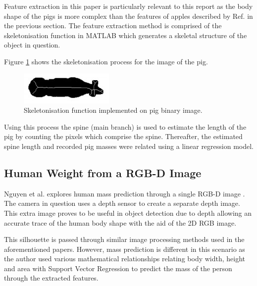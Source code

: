 \documentclass[conference]{IEEEtran}
\begin{document}
Feature extraction in this paper is particularly relevant to this report as the body shape of the pigs is more complex than the features of apples described by Ref. \cite{comert} in the previous section. 
The feature extraction method is comprised of the skeletonisation function in MATLAB which generates a skeletal structure of the object in question.

Figure \ref{fig:pigskeleton} shows the skeletonisation process for the image of the pig.
\begin{figure}
    \centering
    \includegraphics[width=\linewidth]{pigskeleton.jpg}
    \caption{Skeletonisation function implemented on pig binary image\cite{kollis2007weight}.}
    \label{fig:pigskeleton}
\end{figure}

Using this process the spine (main branch) is used to estimate the length of the pig by counting the pixels which comprise the spine.
Thereafter, the estimated spine length and recorded pig masses were related using a linear regression model.

\subsection{Human Weight from a RGB-D Image}
Nguyen et al. explores human mass prediction through a single RGB-D image \cite{nguyen2014seeing}.
The camera in question uses a depth sensor to create a separate depth image. 
This extra image proves to be useful in object detection due to depth allowing an accurate trace of the human body shape with the aid of the 2D RGB image. 

This silhouette is passed through similar image processing methods used in the aforementioned papers. 
However, mass prediction is different in this scenario as the author used various mathematical relationships relating body width, height and area with Support Vector Regression to predict the mass of the person through the extracted features.
\end{document}
